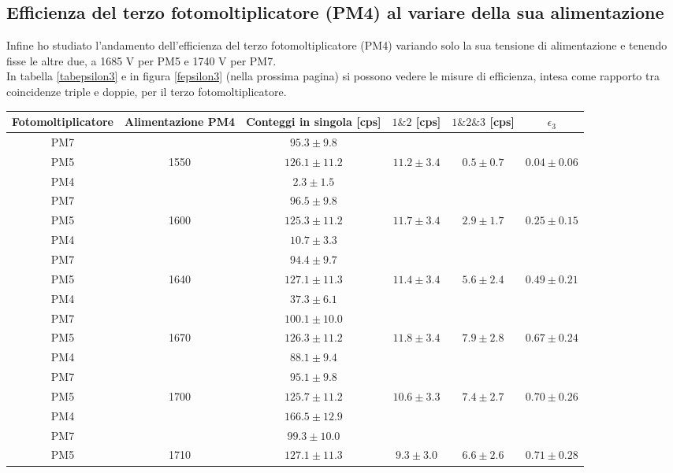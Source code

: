 \documentclass{article}
\begin{document}
\newpage
\subsection{Efficienza del terzo fotomoltiplicatore (PM4) al variare della sua alimentazione}
Infine ho studiato l'andamento dell'efficienza del terzo fotomoltiplicatore (PM4) variando solo la sua tensione di alimentazione e tenendo fisse le altre due, a 1685 V per PM5 e 1740 V per PM7.
\\
In tabella \ref{tabepsilon3} e in figura  \ref{fepsilon3} (nella prossima pagina) si possono vedere le misure di efficienza, intesa come rapporto tra coincidenze triple e doppie, per il terzo fotomoltiplicatore. 

\begin{table}[H]
\centering
\begin{tabular}{|c|c|c|c|c|c|}
\hline
Fotomoltiplicatore & Alimentazione PM4 & Conteggi in singola [cps] & $1 \& 2$  [cps]&  $1\&2\& 3$ [cps]& $\epsilon_3$\\ 
\hline
\hline 
PM7 & & $95.3 \pm 9.8$ &  & & \\ 
PM5 & 1550 & $126.1 \pm 11.2$ & $11.2 \pm 3.4$  & $0.5 \pm 0.7$& $0.04 \pm 0.06$\\ 
PM4 & & $2.3 \pm 1.5$ &  & &\\ 
\hline 
PM7 & & $96.5 \pm 9.8$ &  & & \\ 
PM5 & 1600 & $125.3 \pm 11.2$ & $11.7 \pm 3.4$  & $2.9 \pm 1.7$& $0.25 \pm 0.15$\\ 
PM4 & & $10.7 \pm 3.3$ &  & &\\ 
\hline 
PM7 & & $94.4 \pm 9.7$ &  & & \\ 
PM5 & 1640 & $127.1 \pm 11.3$ & $11.4 \pm 3.4$  & $5.6 \pm 2.4$& $0.49 \pm 0.21$\\ 
PM4 & & $37.3 \pm 6.1$ &  & &\\ 
\hline 
PM7 & & $100.1 \pm 10.0$ &  & & \\ 
PM5 & 1670 & $126.3 \pm 11.2$ & $11.8 \pm 3.4$  & $7.9 \pm 2.8$& $0.67 \pm 0.24$\\ 
PM4 & & $88.1 \pm 9.4$ &  & &\\ 
\hline 
PM7 & & $95.1 \pm 9.8$ &  & & \\ 
PM5 & 1700 & $125.7 \pm 11.2$ & $10.6 \pm 3.3$  & $7.4 \pm 2.7$& $0.70 \pm 0.26$\\ 
PM4 & & $166.5 \pm 12.9$ &  & &\\ 
\hline 
PM7 & & $99.3 \pm 10.0$ &  & & \\ 
PM5 & 1710 & $127.1 \pm 11.3$ & $9.3 \pm 3.0$  & $6.6 \pm 2.6$& $0.71 \pm 0.28$\\ 

\end{tabular}
\end{table}
\end{document}
